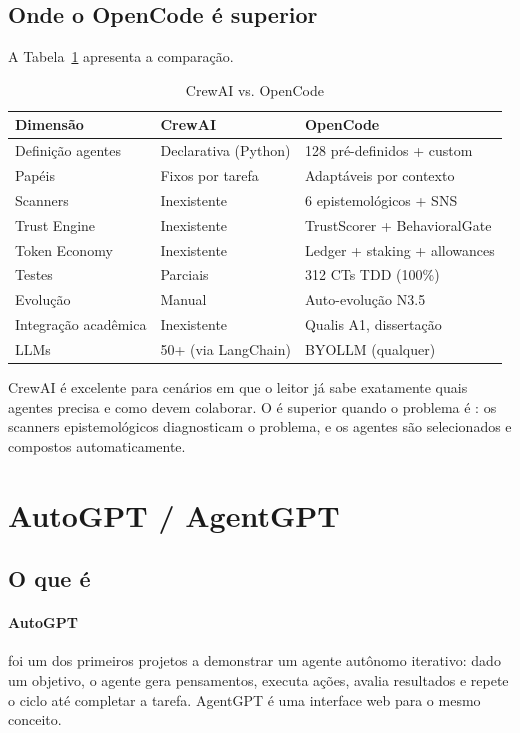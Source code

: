 \subsection{Onde o OpenCode é superior}
A Tabela~\ref{tab:comparacao-crewai} apresenta a comparação.
\begin{table}[htb]
\centering
\caption{CrewAI vs. OpenCode}
\label{tab:comparacao-crewai}
\begin{tabular}{lll}
\toprule
\textbf{Dimensão} & \textbf{CrewAI} & \textbf{OpenCode} \\
\midrule
Definição agentes & Declarativa (Python) & 128 pré-definidos + custom \\
Papéis & Fixos por tarefa & Adaptáveis por contexto \\
Scanners & Inexistente & 6 epistemológicos + SNS \\
Trust Engine & Inexistente & TrustScorer + BehavioralGate \\
Token Economy & Inexistente & Ledger + staking + allowances \\
Testes & Parciais & 312 CTs TDD (100\%) \\
Evolução & Manual & Auto-evolução N3.5 \\
Integração acadêmica & Inexistente & Qualis A1, dissertação \\
LLMs & 50+ (via LangChain) & BYOLLM (qualquer) \\
\bottomrule
\end{tabular}
\end{table}
\noindent CrewAI é excelente para cenários em que o leitor já sabe
exatamente quais agentes precisa e como devem colaborar. O \opencodeeco{}
é superior quando o problema é : os
scanners epistemológicos diagnosticam o problema, e os agentes são
selecionados e compostos automaticamente.
\section{AutoGPT / AgentGPT}
\label{sec:autogpt}
\nivelintermediario
\subsection{O que é}
\paragraph{AutoGPT} foi um dos primeiros projetos a demonstrar um agente
autônomo iterativo: dado um objetivo, o agente gera pensamentos, executa
ações, avalia resultados e repete o ciclo até completar a tarefa. AgentGPT
é uma interface web para o mesmo conceito.
